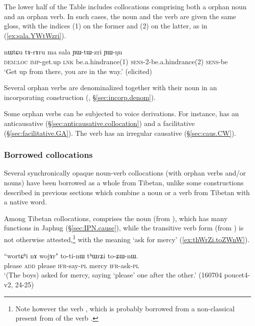 The lower half of the Table includes collocations comprising both a orphan noun and an orphan verb. In such cases, the noun and the verb are given the same gloss, with the indices (1) on the former and (2) on the latter, as in (\ref{ex:sala.YWtWzri}). %

\begin{exe}
\ex \label{ex:sala.YWtWzri}
\gll nɯtɕu tɤ-rɤru ma sala ɲɯ-tɯ-zri ɲɯ-ŋu \\
\textsc{dem}:\textsc{loc} \textsc{imp}-get.up \textsc{lnk} be.a.hindrance(1) \textsc{sens}-2-be.a.hindrance(2) \textsc{sens}-be \\
\glt `Get up from there, you are in the way.' (elicited)
\end{exe}

Several orphan verbs are denominalized together with their noun in an incorporating construction (, §\ref{sec:incorp.denom}).

Some orphan verbs can be subjected to voice derivations. For instance,  has an anticausative  (§\ref{sec:anticausative.collocation}) and a facilitative (§\ref{sec:facilitative.GA}). The verb  has an irregular  causative (§\ref{sec:caus.CW}).


\subsubsection{Borrowed collocations} \label{sec:borrowed.NV}
Several synchronically opaque noun-verb collocations (with orphan verbs and/or nouns) have been borrowed as a whole from Tibetan, unlike some constructions described in previous sections which combine a noun or a verb from Tibetan with a native word.

Among Tibetan collocations,  comprises the noun   (from ), which has many functions in Japhug (§\ref{sec:IPN.cause}), while the  transitive verb form  (from ) is not otherwise attested,\footnote{Note however the verb , which is probably borrowed from a non-classical present from  of the verb . } with the meaning `ask for mercy' (\ref{ex:thWrZi.toZWnW}).

\begin{exe}
\ex \label{ex:thWrZi.toZWnW}
\gll ``wortɕʰi nɤ wojɤr" to-ti-nɯ tʰɯrʑi to-ʑɯ-nɯ. \\
please \textsc{add} please \textsc{ifr}-say-\textsc{pl} mercy \textsc{ifr}-ask-\textsc{pl} \\
\glt `(The boys) asked for mercy, saying `please' one after the other.' (160704 poucet4-v2, 24-25)
 \end{exe}  
 
